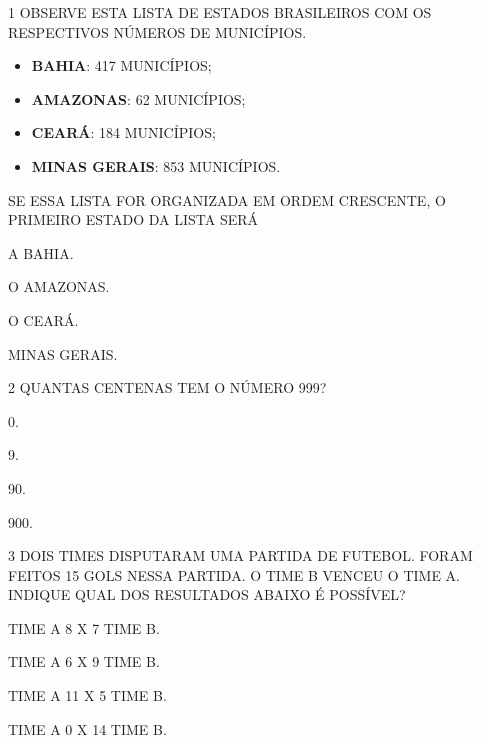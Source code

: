 \pagebreak




\num{1} OBSERVE ESTA LISTA DE ESTADOS BRASILEIROS COM OS RESPECTIVOS NÚMEROS DE MUNICÍPIOS.

\begin{itemize}
  \item \textbf{BAHIA}: 417 MUNICÍPIOS;
  \item \textbf{AMAZONAS}: 62 MUNICÍPIOS;
  \item \textbf{CEARÁ}: 184 MUNICÍPIOS;
  \item \textbf{MINAS GERAIS}: 853 MUNICÍPIOS.
\end{itemize}

SE ESSA LISTA FOR ORGANIZADA EM ORDEM CRESCENTE, O PRIMEIRO ESTADO DA LISTA SERÁ

\begin{escolha}[itemsep=0pt]
\item A BAHIA.

\item O AMAZONAS.

\item O CEARÁ.

\item MINAS GERAIS.
\end{escolha}

\num{2} QUANTAS CENTENAS TEM O NÚMERO 999?

\begin{escolha}[itemsep=0pt]
\item 0.

\item 9.

\item 90.

\item 900.
\end{escolha}

\num{3} DOIS TIMES DISPUTARAM UMA PARTIDA DE FUTEBOL. FORAM FEITOS 15 GOLS NESSA
PARTIDA. O TIME B VENCEU O TIME A. INDIQUE QUAL DOS RESULTADOS ABAIXO É
POSSÍVEL?

\begin{escolha}[itemsep=0pt]
\item TIME A 8 X 7 TIME B.

\item TIME A 6 X 9 TIME B.

\item TIME A 11 X 5 TIME B.

\item TIME A 0 X 14 TIME B.
\end{escolha}

